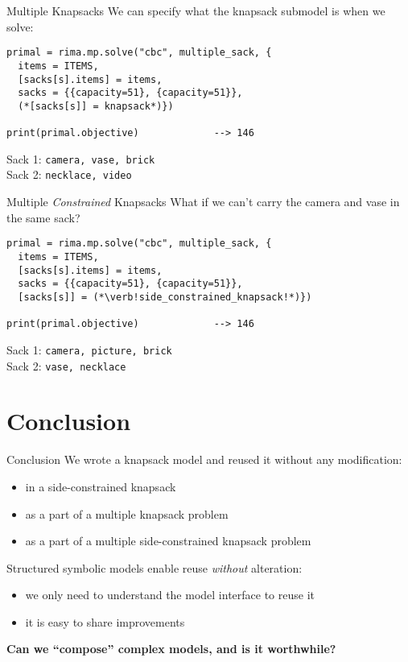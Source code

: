 \documentclass[smaller,handout]{beamer}
\begin{document}
\begin{frame}[fragile]{Multiple Knapsacks}
  We can specify what the knapsack submodel is when we solve:

  \begin{lstlisting}
primal = rima.mp.solve("cbc", multiple_sack, {
  items = ITEMS,
  [sacks[s].items] = items,
  sacks = {{capacity=51}, {capacity=51}},
  (*[sacks[s]] = knapsack*)})

print(primal.objective)             --> 146
  \end{lstlisting}
  Sack 1: \lstinline!camera, vase, brick!\\
  Sack 2: \lstinline!necklace, video!
\end{frame}


\begin{frame}[fragile]{Multiple \emph{Constrained} Knapsacks}
  What if we can't carry the camera and vase in the same sack?

  \begin{lstlisting}
primal = rima.mp.solve("cbc", multiple_sack, {
  items = ITEMS,
  [sacks[s].items] = items,
  sacks = {{capacity=51}, {capacity=51}},
  [sacks[s]] = (*\verb!side_constrained_knapsack!*)})

print(primal.objective)             --> 146
  \end{lstlisting}
  Sack 1: \lstinline!camera, picture, brick!\\
  Sack 2: \lstinline!vase, necklace!
\end{frame}


\section{Conclusion}

\begin{frame}{Conclusion}
  We wrote a knapsack model and reused it without any modification:
  \begin{itemize}
    \item in a side-constrained knapsack
    \item as a part of a multiple knapsack problem
    \item as a part of a multiple side-constrained knapsack problem
  \end{itemize}

  Structured symbolic models enable reuse \emph{without} alteration:
  \begin{itemize}
    \item we only need to understand the model interface to reuse it
    \item it is easy to share improvements
  \end{itemize}

  {\bf Can we ``compose'' complex models, and is it worthwhile?}
\end{frame}
\end{document}
